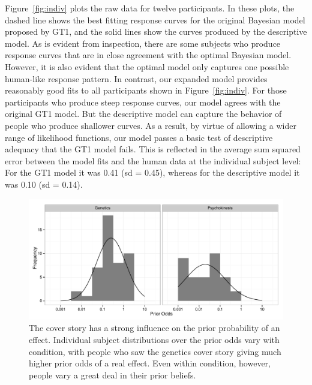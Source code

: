 \documentclass[doc,floatsintext]{apa6}
\begin{document}
Figure~\ref{fig:indiv} plots the raw data for twelve participants. In these plots, the dashed line shows the best fitting response curves for the original Bayesian model proposed by GT1, and the solid lines show the curves produced by the descriptive model. As is evident from inspection, there are some subjects who produce response curves that are in close agreement with the optimal Bayesian model. However, it is also evident that the optimal model only captures one possible human-like response pattern. In contrast, our expanded model provides reasonably good fits to all participants shown in Figure~\ref{fig:indiv}. For those participants who produce steep response curves, our model agrees with the original GT1 model. But the descriptive model can capture the behavior of people who produce shallower curves. As a result, by virtue of allowing a wider range of likelihood functions, our model passes a basic test of descriptive adequacy that the GT1 model fails. This is reflected in the average sum squared error between the model fits and the human data at the individual subject level: For the GT1 model it was 0.41 (sd = 0.45), whereas for the descriptive model it was 0.10 (sd = 0.14).

\bigskip

\begin{figure}[]
	\centering
	\includegraphics[width=.95\textwidth]{coincidences_figures/priorVariation.pdf}
	\caption{The cover story has a strong influence on the prior probability of an effect. Individual subject distributions over the prior odds vary with condition, with people who saw the {\sc genetics} cover story giving much higher prior odds of a real effect. Even within condition, however, people vary a great deal in their prior beliefs.}
	\label{fig:coverstory}
\end{figure}
\end{document}
